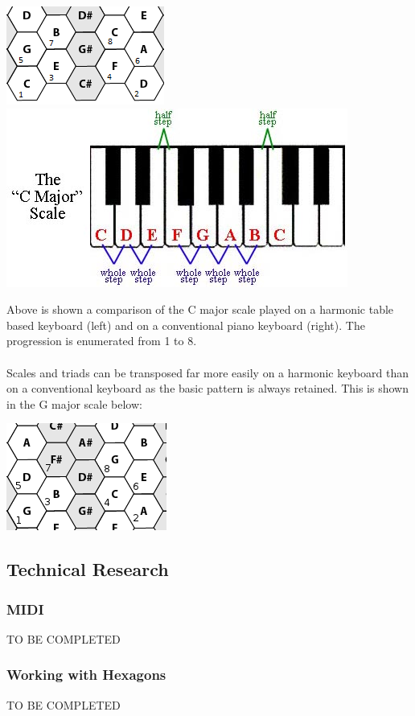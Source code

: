 \documentclass[10pt,a4paper]{article}
\begin{document}
\begin{center}
\includegraphics[scale=0.7]{scale.png}
\includegraphics[scale=1.5]{scale2.jpg}
\end{center}
Above is shown a comparison of the C major scale played on a harmonic table based keyboard (left) and on a conventional piano keyboard (right). The progression is enumerated from 1 to 8.\\
\\
Scales and triads can be transposed far more easily on a harmonic keyboard than on a conventional keyboard as the basic pattern is always retained. This is shown in the G major scale below:
\begin{center}
\includegraphics[scale=0.5]{scale3.png}
\end{center}
\subsection{Technical Research}
\subsubsection{MIDI}
TO BE COMPLETED
\subsubsection{Working with Hexagons}
TO BE COMPLETED
\end{document}
